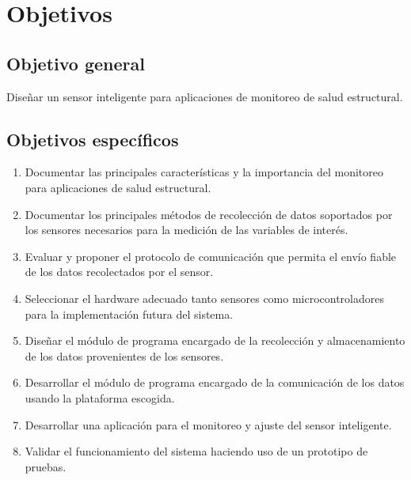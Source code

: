 \newpage

\section{Objetivos}

\subsection{Objetivo general}

Diseñar un sensor inteligente para aplicaciones de monitoreo de salud estructural.

\subsection{Objetivos específicos}

\begin{enumerate}

	\item Documentar las principales características y la importancia del monitoreo para aplicaciones de salud estructural.

	\item Documentar los principales métodos de recolección de datos soportados por los sensores necesarios para la medición de las variables de interés.

	\item Evaluar y proponer el protocolo de comunicación que permita el envío fiable de los datos recolectados por el sensor.

	\item Seleccionar el hardware adecuado tanto sensores como microcontroladores para la implementación futura del sistema.

	\item Diseñar el módulo de programa encargado de la recolección y almacenamiento de los datos provenientes de los sensores.

	\item Desarrollar el módulo de programa encargado de la comunicación de los datos usando la plataforma escogida.
	
	\item Desarrollar una aplicación para el monitoreo y ajuste del sensor inteligente.

	\item Validar el funcionamiento del sistema haciendo uso de un prototipo de pruebas.

\end{enumerate}

